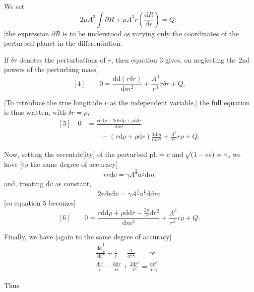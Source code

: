 \par
\noindent\hspace*{\parindent}We set
\[
2\mu A^{3}\int\partial R+\mu A^{3}r\left(\frac{\mathrm{d}R}{\mathrm{d}r}\right)=Q;
\]
[the expression \(\partial R\) is to be understood as varying only the coordinates of the perturbed planet in the differentiation.
\par
\noindent\hspace*{\parindent}If \(\delta r\) denotes the perturbations of \(r\), then equation 3 gives, on neglecting the 2nd powers of the perturbing mass]
\[
[4]\qquad 0=\frac{\mathrm{d}\mathrm{d}(r\delta r)}{\mathrm{d}m^{2}}+\frac{A^{3}}{r^{3}}r\delta r+Q.
\]
\par
\noindent\hspace*{\parindent}[To introduce the true longitude \(v\) as the independent variable,] the full equation is thus written, with \(\delta r=\rho\),
\[
\begin{aligned}
[5]\quad 0&=\frac{r\mathrm{d}\mathrm{d}\rho+2\mathrm{d}r\mathrm{d}\rho+\rho\mathrm{d}\mathrm{d}r}{\mathrm{d}m^{2}}\\
&\qquad-(r\mathrm{d}\rho+\rho\mathrm{d}r)\frac{\mathrm{d}\mathrm{d}m}{\mathrm{d}m^{3}}+\frac{A^{3}}{r^{3}}r\rho+Q.
\end{aligned}
\]
\par
\noindent\hspace*{\parindent}Now, setting the eccentric[ity] of the perturbed pl.\(=e\) and \(\mathord{{}^{}\!\surd}(1-ee)=\gamma\), we have [to the same degree of accuracy]
\[
rr\mathrm{d}v=\gamma A^{\frac32}a^{\frac12}\mathrm{d}m
\]
and, treating \(\mathrm{d}v\) as constant,
\[
2r\mathrm{d}r\mathrm{d}v=\gamma A^{\frac32}a^{\frac12}\mathrm{d}\mathrm{d}m
\]
[so equation 5 becomes]
\[
[6]\qquad 0=\frac{r\mathrm{d}\mathrm{d}\rho+\rho\mathrm{d}\mathrm{d}r-\frac{2\rho}{r}\mathrm{d}r^{2}}{\mathrm{d}m^{2}}+\frac{A^{3}}{r^{3}}r\rho+Q.
\]
\par
\noindent\hspace*{\parindent}Finally, we have [again to the same degree of accuracy]
\[
\begin{gathered}
\frac{\mathrm{d}\mathrm{d}\dfrac1r}{\mathrm{d}v^{2}}+\frac1r=\frac1{a\gamma\gamma}\qquad\text{or}\\[4pt]
\frac{\mathrm{d}v^{2}}{r}-\frac{\mathrm{d}\mathrm{d}r}{rr}+\frac{2\mathrm{d}r^{2}}{r^{3}}=\frac{\mathrm{d}v^{2}}{a\gamma\gamma}\mathpunct{\cdot}
\end{gathered}
\]
\par
\noindent\hspace*{\parindent}Thus
